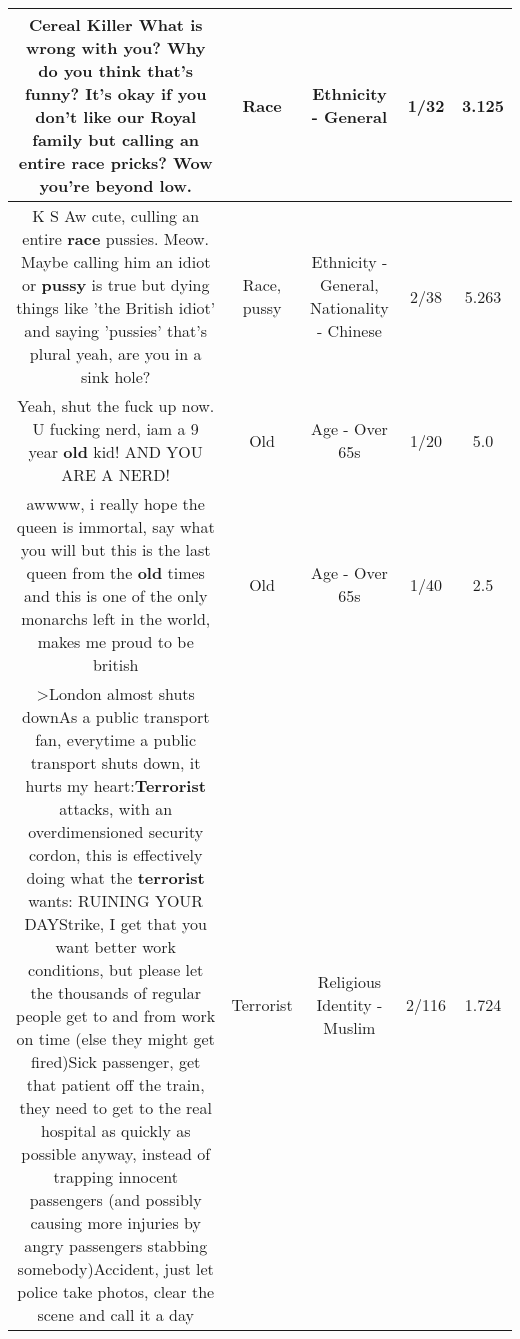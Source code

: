 \documentclass[11pt]{article}
\newlength\mylength
\begin{document}
\begin{center}
\begin{longtable}{|C{.65\mylength}|C{.30\mylength}|C{.12\mylength}|C{.12\mylength}|C{.12\mylength}|}
  \small Cereal Killer What is wrong with you? Why do you think that's funny? It's okay if you don't like our Royal family but calling an entire \textbf{race} pricks? Wow you're beyond low.\normalsize   & Race & Ethnicity - General & 1/32 & 3.125 \\  \hline
  \small K S Aw cute, culling an entire \textbf{race} pussies. Meow. Maybe calling him an idiot or \textbf{pussy} is true but dying things like 'the British idiot' and saying 'pussies' that's plural yeah, are you in a sink hole?\normalsize   & Race, pussy & Ethnicity - General, Nationality - Chinese & 2/38 & 5.263 \\  \hline
  \small Yeah, shut the fuck up now. U fucking nerd, iam a 9 year \textbf{old} kid! AND YOU ARE A NERD!\normalsize   & Old & Age - Over 65s & 1/20 & 5.0 \\  \hline
  \small awwww, i really hope the queen is immortal, say what you will but this is the last queen from the \textbf{old} times and this is one of the only monarchs left in the world, makes me proud to be british\normalsize   & Old & Age - Over 65s & 1/40 & 2.5 \\  \hline
  \small >London almost shuts downAs a public transport fan, everytime a public transport shuts down, it hurts my heart:\textbf{Terrorist} attacks, with an overdimensioned security cordon, this is effectively doing what the \textbf{terrorist} wants: RUINING YOUR DAYStrike, I get that you want better work conditions, but please let the thousands of regular people get to and from work on time (else they might get fired)Sick passenger, get that patient off the train, they need to get to the real hospital as quickly as possible anyway, instead of trapping innocent passengers (and possibly causing more injuries by angry passengers stabbing somebody)Accident, just let police take photos, clear the scene and call it a day\normalsize   & Terrorist & Religious Identity - Muslim & 2/116 & 1.724 \\  \hline

\end{longtable}
\end{center}
\end{document}
